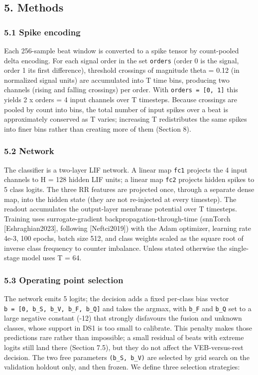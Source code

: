 \documentclass[
]{article}
\begin{document}
\subsection{5. Methods}\label{methods}

\subsubsection{5.1 Spike encoding}\label{spike-encoding}

Each 256-sample beat window is converted to a spike tensor by
count-pooled delta encoding. For each signal order in the set
\texttt{orders} (order 0 is the signal, order 1 its first difference),
threshold crossings of magnitude theta = 0.12 (in normalized signal
units) are accumulated into T time bins, producing two channels (rising
and falling crossings) per order. With \texttt{orders\ =\ {[}0,\ 1{]}}
this yields 2 x \textbar orders\textbar{} = 4 input channels over T
timesteps. Because crossings are pooled by count into bins, the total
number of input spikes over a beat is approximately conserved as T
varies; increasing T redistributes the same spikes into finer bins
rather than creating more of them (Section 8).

\subsubsection{5.2 Network}\label{network}

The classifier is a two-layer LIF network. A linear map \texttt{fc1}
projects the 4 input channels to H = 128 hidden LIF units; a linear map
\texttt{fc2} projects hidden spikes to 5 class logits. The three RR
features are projected once, through a separate dense map, into the
hidden state (they are not re-injected at every timestep). The readout
accumulates the output-layer membrane potential over T timesteps.
Training uses surrogate-gradient backpropagation-through-time (snnTorch
{[}Eshraghian2023{]}, following {[}Neftci2019{]}) with the Adam
optimizer, learning rate 4e-3, 100 epochs, batch size 512, and class
weights scaled as the square root of inverse class frequency to counter
imbalance. Unless stated otherwise the single-stage model uses T = 64.

\subsubsection{5.3 Operating point
selection}\label{operating-point-selection}

The network emits 5 logits; the decision adds a fixed per-class bias
vector \texttt{b\ =\ {[}0,\ b\_S,\ b\_V,\ b\_F,\ b\_Q{]}} and takes the
argmax, with \texttt{b\_F} and \texttt{b\_Q} set to a large negative
constant (-12) that strongly disfavours the fusion and unknown classes,
whose support in DS1 is too small to calibrate. This penalty makes those
predictions rare rather than impossible; a small residual of beats with
extreme logits still land there (Section 7.5), but they do not affect
the VEB-versus-rest decision. The two free parameters
\texttt{(b\_S,\ b\_V)} are selected by grid search on the validation
holdout only, and then frozen. We define three selection strategies:
\end{document}
